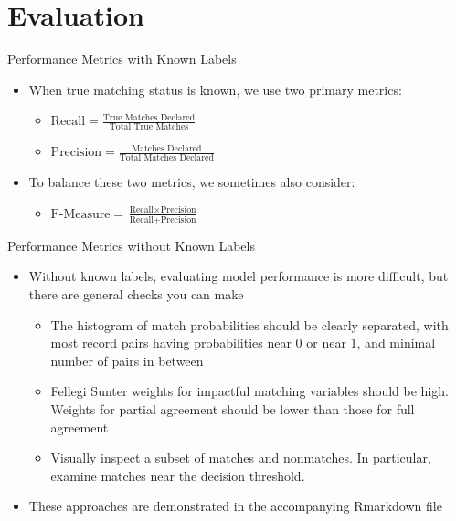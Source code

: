 \documentclass{beamer}
\begin{document}
\section{Evaluation}

\begin{frame}{Performance Metrics with Known Labels}
	\begin{itemize}
		\item When true matching status is known, we use two primary metrics:
		\begin{itemize}
		\item $\text{Recall} = \frac{\text{True Matches Declared}}{\text{Total True Matches}}$
		\item $\text{Precision} = \frac{\text{Matches Declared}}{\text{Total Matches Declared}}$
		\end{itemize}
		\item To balance these two metrics, we sometimes also consider:
		\begin{itemize}
		\item  $\text{F-Measure} = \frac{\text{Recall} \times \text{Precision}}{\text{Recall} + \text{Precision}}$
		\end{itemize}
	\end{itemize}
\end{frame}

\begin{frame}{Performance Metrics without Known Labels}
	\begin{itemize}
		\item Without known labels, evaluating model performance is more difficult, but there are general checks you can make
		\begin{itemize}
			\item The histogram of match probabilities should be clearly separated, with most record pairs having probabilities near 0 or near 1, and minimal number of pairs in between
			\item  Fellegi Sunter weights for impactful matching variables should be high. Weights for partial agreement should be lower than those for full agreement
			\item Visually inspect a subset of matches and nonmatches. In particular, examine matches near the decision threshold.
		\end{itemize}
	\item These approaches are demonstrated in the accompanying Rmarkdown file
	\end{itemize}
\end{frame}
\end{document}
